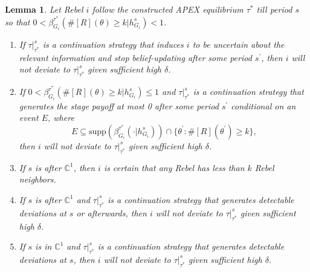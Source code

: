 \documentclass[12pt,letter]{article}
\newcommand{\Kappa}{\mathbb{C}}
\newtheorem{lemma}{Lemma}[section]
\theoremstyle{definition}
\theoremstyle{remark}
\theoremstyle{claim}
\begin{document}
\begin{lemma}
\label{lemma:uncertain}
Let Rebel $i$ follow the constructed APEX equilibrium $\tau^{*}$ till period $s$ so that $0<\beta^{\tau^{*}}_{G_i}(\#[R](\theta)\geq k|h^s_{G_i})<1$.
\begin{enumerate}[label=(\arabic*)]
\item If $\tau|^s_{\tau^{*}}$ is a continuation strategy that induces $i$ to be uncertain about the relevant information and stop belief-updating after some period $s^{'}$, then $i$ will not deviate to $\tau|^s_{\tau^{*}}$ given sufficient high $\delta$.
\item If $0<\beta^{\tau^{*}}_{G_i}(\#[R](\theta)\geq k|h^s_{G_i})\leq1$ and $\tau|^s_{\tau^{*}}$ is a continuation strategy that generates the stage payoff at most 0 after some period $s^{'}$ conditional on an event $E$, where 
\[E\subseteq \mathrm{supp}(\beta^{\tau^{*}}_{G_i}(\cdot |h^s_{G_i}))\cap\{\theta^{'}:\#[R](\theta^{'})\geq k\},\] 
then $i$ will not deviate to $\tau|^s_{\tau^{*}}$ given sufficient high $\delta$.
\item If $s$ is after $\Kappa^1$, then $i$ is certain that any Rebel has less than $k$ Rebel neighbors.
\item If $s$ is after $\Kappa^1$ and $\tau|^s_{\tau^{*}}$ is a continuation strategy that generates detectable deviations at $s$ or afterwards, then $i$ will not deviate to $\tau|^s_{\tau^{*}}$ given sufficient high $\delta$.
\item If $s$ is in $\Kappa^1$ and $\tau|^s_{\tau^{*}}$ is a continuation strategy that generates detectable deviations at $s$, then $i$ will not deviate to $\tau|^s_{\tau^{*}}$ given sufficient high $\delta$.
\end{enumerate}

\end{lemma}
\end{document}
